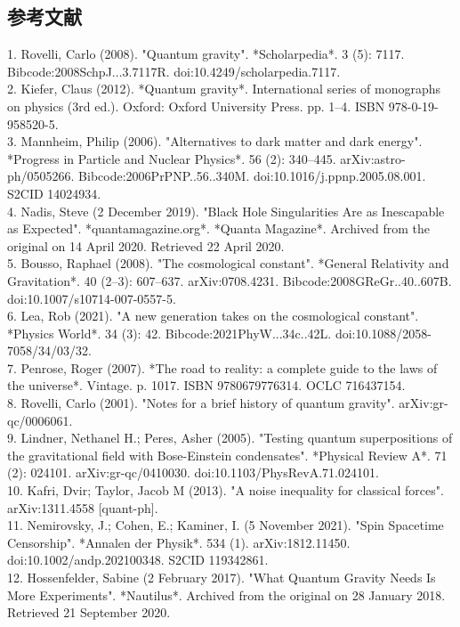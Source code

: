 \subsection{参考文献}
1. Rovelli, Carlo (2008). "Quantum gravity". *Scholarpedia*. 3 (5): 7117. Bibcode:2008SchpJ...3.7117R. doi:10.4249/scholarpedia.7117.\\ 
2. Kiefer, Claus (2012). *Quantum gravity*. International series of monographs on physics (3rd ed.). Oxford: Oxford University Press. pp. 1–4. ISBN 978-0-19-958520-5.\\
3. Mannheim, Philip (2006). "Alternatives to dark matter and dark energy". *Progress in Particle and Nuclear Physics*. 56 (2): 340–445. arXiv:astro-ph/0505266. Bibcode:2006PrPNP..56..340M. doi:10.1016/j.ppnp.2005.08.001. S2CID 14024934. \\
4. Nadis, Steve (2 December 2019). "Black Hole Singularities Are as Inescapable as Expected". *quantamagazine.org*. *Quanta Magazine*. Archived from the original on 14 April 2020. Retrieved 22 April 2020.\\
5. Bousso, Raphael (2008). "The cosmological constant". *General Relativity and Gravitation*. 40 (2–3): 607–637. arXiv:0708.4231. Bibcode:2008GReGr..40..607B. doi:10.1007/s10714-007-0557-5.\\
6. Lea, Rob (2021). "A new generation takes on the cosmological constant". *Physics World*. 34 (3): 42. Bibcode:2021PhyW...34c..42L. doi:10.1088/2058-7058/34/03/32.\\
7. Penrose, Roger (2007). *The road to reality: a complete guide to the laws of the universe*. Vintage. p. 1017. ISBN 9780679776314. OCLC 716437154.\\
8. Rovelli, Carlo (2001). "Notes for a brief history of quantum gravity". arXiv:gr-qc/0006061.\\
9. Lindner, Nethanel H.; Peres, Asher (2005). "Testing quantum superpositions of the gravitational field with Bose-Einstein condensates". *Physical Review A*. 71 (2): 024101. arXiv:gr-qc/0410030. doi:10.1103/PhysRevA.71.024101.\\
10. Kafri, Dvir; Taylor, Jacob M (2013). "A noise inequality for classical forces". arXiv:1311.4558 [quant-ph].\\
11. Nemirovsky, J.; Cohen, E.; Kaminer, I. (5 November 2021). "Spin Spacetime Censorship". *Annalen der Physik*. 534 (1). arXiv:1812.11450. doi:10.1002/andp.202100348. S2CID 119342861.\\
12. Hossenfelder, Sabine (2 February 2017). "What Quantum Gravity Needs Is More Experiments". *Nautilus*. Archived from the original on 28 January 2018. Retrieved 21 September 2020.\\
